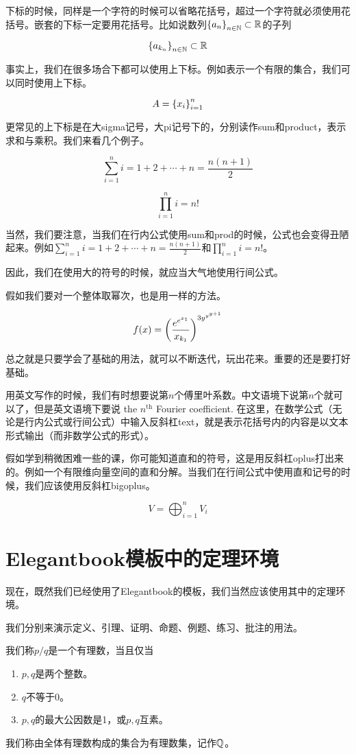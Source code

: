 下标的时候，同样是一个字符的时候可以省略花括号，超过一个字符就必须使用花括号。嵌套的下标一定要用花括号。比如说数列$\left\{a_n\right\}_{n\in\mathbb{N}}\subset \mathbb{R}$的子列

\[  \left\{a_{k_n}\right\}_{n\in\mathbb{N}}\subset \mathbb{R}    \]

事实上，我们在很多场合下都可以使用上下标。例如表示一个有限的集合，我们可以同时使用上下标。

\[ A=\left\{x_i\right\}_{i=1}^{n}     \]

更常见的上下标是在大sigma记号，大pi记号下的，分别读作sum和product，表示求和与乘积。我们来看几个例子。

\[  \sum_{i=1}^ni=1+2+\cdots+n=\frac{n(n+1)}{2}    \]

\[ \prod_{i=1}^ni=n!     \]

当然，我们要注意，当我们在行内公式使用sum和prod的时候，公式也会变得丑陋起来。例如$\sum_{i=1}^ni=1+2+\cdots+n=\frac{n(n+1)}{2}$和$\prod_{i=1}^ni=n!$。

因此，我们在使用大的符号的时候，就应当大气地使用行间公式。

假如我们要对一个整体取幂次，也是用一样的方法。

\[  f(x)=\left( \frac{e^{e^{x_1}}}{x_{k_1}} \right)^{3y^{y^{y+1}}}    \]

总之就是只要学会了基础的用法，就可以不断迭代，玩出花来。重要的还是要打好基础。

用英文写作的时候，我们有时想要说第$n$个傅里叶系数。中文语境下说第$n$个就可以了，但是英文语境下要说 the $n^{\text{th}}$ Fourier coefficient. 在这里，在数学公式（无论是行内公式或行间公式）中输入反斜杠text，就是表示花括号内的内容是以文本形式输出（而非数学公式的形式）。

假如学到稍微困难一些的课，你可能知道直和的符号，这是用反斜杠oplus打出来的。例如一个有限维向量空间的直和分解。当我们在行间公式中使用直和记号的时候，我们应该使用反斜杠bigoplus。

\[  V=\bigoplus_{i=1}^n V_i        \]


\section{Elegantbook模板中的定理环境}

现在，既然我们已经使用了Elegantbook的模板，我们当然应该使用其中的定理环境。

我们分别来演示定义、引理、证明、命题、例题、练习、批注的用法。

\begin{definition}[有理数]
我们称$p/q$是一个有理数，当且仅当
\begin{enumerate}
    \item $p,q$是两个整数。
    \item $q$不等于0。
    \item $p,q$的最大公因数是1，或$p,q$互素。
\end{enumerate}

我们称由全体有理数构成的集合为有理数集，记作$\mathbb{Q}$。
\end{definition}

